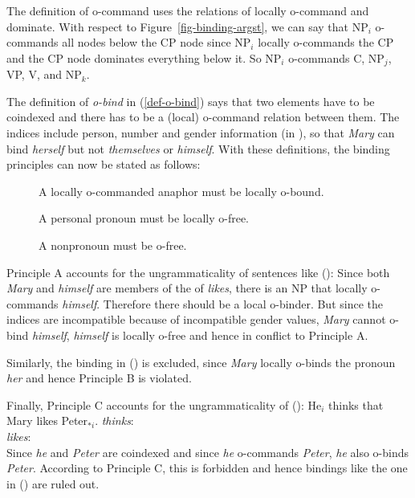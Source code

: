 \documentclass[output=paper
 	        ,biblatex
                ,babelshorthands
                ,newtxmath
                ,draftmode
                ,colorlinks, citecolor=brown
]{langscibook}
\begin{document}
The definition of o-command uses the relations of locally o-command and dominate. With respect to
Figure~\ref{fig-binding-argst}, we can say that NP$_i$ o-commands all nodes below the CP node since
NP$_i$ locally o-commands the CP and the CP node dominates everything below it. So NP$_i$ o-commands
C, NP$_j$, VP, V, and NP$_k$.

The definition of \emph{o-bind} in (\ref{def-o-bind}) says that two elements have to be coindexed
and there has to be a (local) o-command relation between them. The indices include person, number
and gender information (in ), so that \emph{Mary} can bind \emph{herself} but not
\emph{themselves} or \emph{himself}. With these definitions, the binding principles can now be stated
as follows:

\begin{principle-break}
\begin{description}
\item [] A locally o-commanded anaphor must be locally o-bound.
\item [] A personal pronoun must be locally o-free.
\item [] A nonpronoun must be o-free.
\end{description}
\end{principle-break}

\noindent
Principle A accounts for the ungrammaticality of sentences like ():
\eal
{}
\zl
Since both \emph{Mary} and \emph{himself} are members of the \argstl of \emph{likes}, there is an NP
that locally o-commands \emph{himself}. Therefore there should be a local o-binder. But since the
indices are incompatible because of incompatible gender values, \emph{Mary} cannot o-bind
\emph{himself}, \emph{himself} is locally o-free and hence in conflict to Principle A.

Similarly, the binding in () is excluded, since \emph{Mary} locally o-binds the pronoun \emph{her}
and hence Principle B is violated.
\eal
{}
\zl

\noindent
Finally, Principle C accounts for the ungrammaticality of ():
\eal
\ex He$_i$ thinks that Mary likes Peter$_{*i}$.
\ex \emph{thinks}:\\
\argst {}
\ex \emph{likes}:\\
\argst {}
\zl
Since \emph{he} and \emph{Peter} are coindexed and since \emph{he} o-commands \emph{Peter},
\emph{he} also o-binds \emph{Peter}. According to Principle C, this is forbidden and hence bindings
like the one in () are ruled out.
\end{document}
